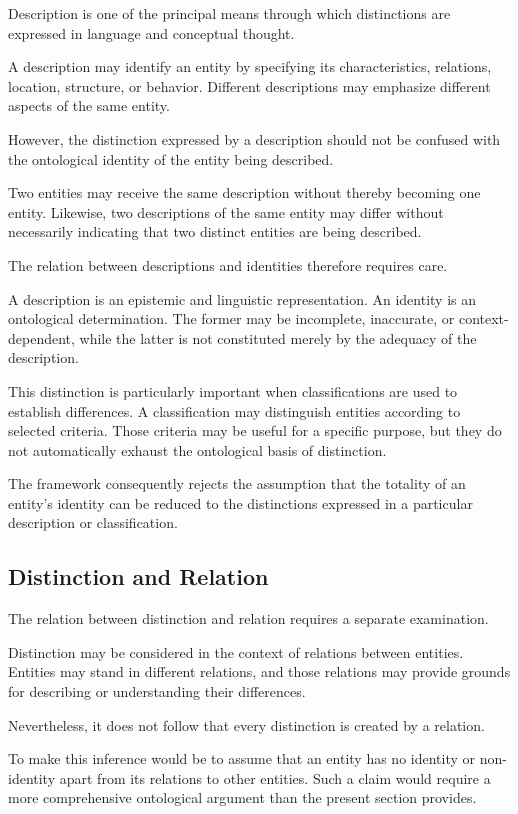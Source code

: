 Description is one of the principal means through
which distinctions are expressed in language and
conceptual thought.

A description may identify an entity by specifying
its characteristics, relations, location, structure,
or behavior. Different descriptions may emphasize
different aspects of the same entity.

However, the distinction expressed by a description
should not be confused with the ontological identity
of the entity being described.

Two entities may receive the same description without
thereby becoming one entity. Likewise, two descriptions
of the same entity may differ without necessarily
indicating that two distinct entities are being
described.

The relation between descriptions and identities
therefore requires care.

A description is an epistemic and linguistic
representation. An identity is an ontological
determination. The former may be incomplete,
inaccurate, or context-dependent, while the latter
is not constituted merely by the adequacy of the
description.

This distinction is particularly important when
classifications are used to establish differences.
A classification may distinguish entities according
to selected criteria. Those criteria may be useful
for a specific purpose, but they do not automatically
exhaust the ontological basis of distinction.

The framework consequently rejects the assumption
that the totality of an entity's identity can be
reduced to the distinctions expressed in a particular
description or classification.

\subsection{Distinction and Relation}

The relation between distinction and relation
requires a separate examination.

Distinction may be considered in the context of
relations between entities. Entities may stand
in different relations, and those relations may
provide grounds for describing or understanding
their differences.

Nevertheless, it does not follow that every
distinction is created by a relation.

To make this inference would be to assume that
an entity has no identity or non-identity apart
from its relations to other entities. Such a
claim would require a more comprehensive
ontological argument than the present section
provides.

